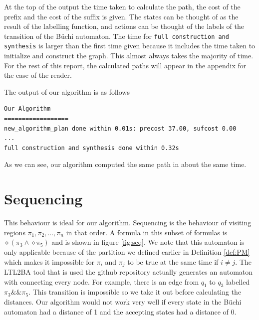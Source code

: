 At the top of the output the time taken to calculate the path, the cost of the prefix and the cost of the suffix is given. The states can be thought of as the result of the labelling function, and actions can be thought of the labels of the transition of the B\"uchi automaton. The time for \texttt{full construction and synthesis} is larger than the first time given because it includes the time taken to initialize and construct the graph. This almost always takes the majority of time. For the rest of this report, the calculated paths will appear in the appendix for the ease of the reader.

The output of our algorithm is as follows
\begingroup
\fontsize{9pt}{12pt}\selectfont
\begin{lstlisting}
Our Algorithm
==================
new_algorithm_plan done within 0.01s: precost 37.00, sufcost 0.00
...
full construction and synthesis done within 0.32s 
\end{lstlisting}
\endgroup

As we can see, our algorithm computed the same path in about the same time.%
\section{Sequencing}
This behaviour is ideal for our algorithm. Sequencing is the behaviour of visiting regions $\pi_1,\pi_2,\dots,\pi_n$ in that order. A formula in this subset of formulas is $\diamond (\pi_3 \land  \diamond \pi_5)$ and is shown in figure \ref{fig:seq}. We note that this automaton is only applicable because of the partition we defined earlier in Definition \ref{def:PM} which makes it impossible for $\pi_i$ and $\pi_j$ to be true at the same time if $i\neq j$. The LTL2BA tool \cite{ltlbuchiwebsite} that is used the github repository \cite{pMasGit} actually generates an automaton with connecting every node. For example, there is an edge from $q_1$ to $q_3$ labelled $\pi_3 \&\& \pi_5 $. This transition is impossible so we take it out before calculating the distances. Our algorithm would not work very well if every state in the B\"uchi automaton had a distance of 1 and the accepting states had a distance of 0.


